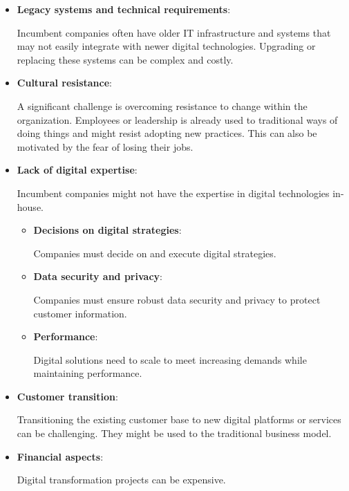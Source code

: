 \documentclass[a4]{scrartcl}
\begin{document}
	
	\begin{itemize}
		
		\item \textbf{Legacy systems and technical requirements}: 
		
		Incumbent companies often have older IT infrastructure and systems that may not easily integrate with newer digital technologies. Upgrading or replacing these systems can be complex and costly.  \cite{legacy, wiwi}
		
		
		\item \textbf{Cultural resistance}: 
		
		A significant challenge is overcoming resistance to change within the organization. Employees or leadership is already used to traditional ways of doing things and might resist adopting new practices. This can also be motivated by the fear of losing their jobs. \cite{wiwi}
		
		
		\item \textbf{Lack of digital expertise}: 
		
		Incumbent companies might not have the expertise in digital technologies in-house. \cite{wiwi}
		
		\begin{itemize}
			
			\item \textbf{Decisions on digital strategies}: 
			
			Companies must decide on and execute digital strategies. \cite{digitalmatrix, leadingdigital, wiwi}
			
			\item \textbf{Data security and privacy}: 
			
			Companies must ensure robust data security and privacy to protect customer information. \cite{digitalmatrix, wiwi}
			
			\item \textbf{Performance}: 
			
			Digital solutions need to scale to meet increasing demands while maintaining performance. \cite{leadingdigital, wiwi}
			
		\end{itemize}
		
		
		\item \textbf{Customer transition}: 
		
		Transitioning the existing customer base to new digital platforms or services can be challenging. They might be used to the traditional business model. \cite{wiwi}
		
		
		\item \textbf{Financial aspects}: 
		
		Digital transformation projects can be expensive. \cite{digitalmatrix, leadingdigital, wiwi}
		

	\end{itemize}
\end{document}
